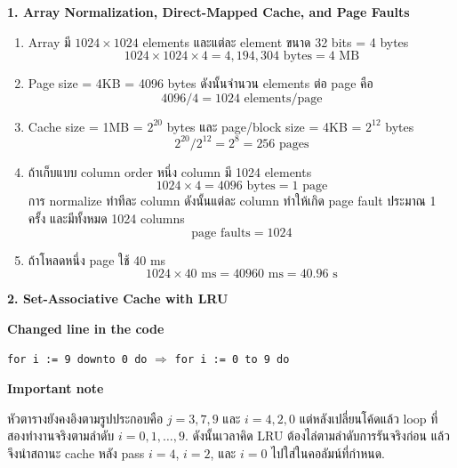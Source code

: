 \documentclass[a4paper,12pt]{article}
\begin{document}
\textbf{1. Array Normalization, Direct-Mapped Cache, and Page Faults}
\begin{enumerate}[label=\textbf{1.\arabic*}]
    \item Array มี $1024 \times 1024$ elements และแต่ละ element ขนาด 32 bits = 4 bytes
    \[
        1024 \times 1024 \times 4 = 4{,}194{,}304 \text{ bytes} = 4 \text{ MB}
    \]

    \item Page size = 4KB = 4096 bytes ดังนั้นจำนวน elements ต่อ page คือ
    \[
        4096 / 4 = 1024 \text{ elements/page}
    \]

    \item Cache size = 1MB = $2^{20}$ bytes และ page/block size = 4KB = $2^{12}$ bytes
    \[
        2^{20}/2^{12}=2^8=256 \text{ pages}
    \]

    \item ถ้าเก็บแบบ column order หนึ่ง column มี 1024 elements
    \[
        1024 \times 4 = 4096 \text{ bytes} = 1 \text{ page}
    \]
    การ normalize ทำทีละ column ดังนั้นแต่ละ column ทำให้เกิด page fault ประมาณ 1 ครั้ง และมีทั้งหมด 1024 columns
    \[
        \text{page faults} = 1024
    \]

    \item ถ้าโหลดหนึ่ง page ใช้ 40 ms
    \[
        1024 \times 40 \text{ ms} = 40960 \text{ ms} = 40.96 \text{ s}
    \]
\end{enumerate}

\vspace{0.5cm}
\textbf{2. Set-Associative Cache with LRU}

\textbf{Changed line in the code}
\begin{center}
\colorbox{yellow!25}{\parbox{0.82\textwidth}{\centering
\texttt{for i := 9 downto 0 do}
\quad $\Longrightarrow$ \quad
\texttt{for i := 0 to 9 do}
}}
\end{center}

\textbf{Important note}

หัวตารางยังคงอิงตามรูปประกอบคือ $j=3,7,9$ และ $i=4,2,0$ แต่หลังเปลี่ยนโค้ดแล้ว loop ที่สองทำงานจริงตามลำดับ $i=0,1,\ldots,9$. ดังนั้นเวลาคิด LRU ต้องไล่ตามลำดับการรันจริงก่อน แล้วจึงนำสถานะ cache หลัง pass $i=4$, $i=2$, และ $i=0$ ไปใส่ในคอลัมน์ที่กำหนด.
\end{document}
